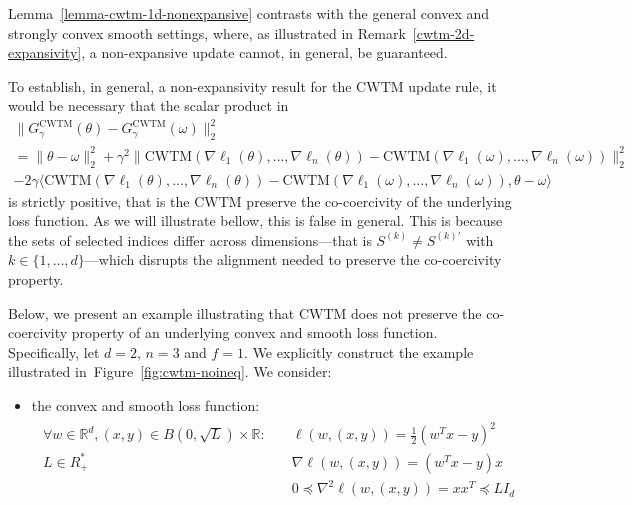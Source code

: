 \documentclass[twoside,11pt]{article}
\newcommand\mb{\mathbb}
\begin{document}
Lemma~\ref{lemma-cwtm-1d-nonexpansive} contrasts with the general convex and strongly convex smooth settings, where, as illustrated in Remark~\ref{cwtm-2d-expansivity}, a non-expansive update cannot, in general, be guaranteed. 
\begin{remark}\label{cwtm-2d-expansivity}
    To establish, in general, a non-expansivity result for the $\mathrm{CWTM}$ update rule, it would be necessary that the scalar product in
    \begin{multline*}
        \| G^{\mathrm{CWTM}}_{\gamma}(\theta) - G^{\mathrm{CWTM}}_{\gamma}(\omega) \|_2^2  \\
        = \| \theta - \omega \|_2^2 
        + \gamma^2 \| \mathrm{CWTM}(\nabla \ell_1 (\theta), \ldots, \nabla \ell_n (\theta)) - \mathrm{CWTM}(\nabla \ell_1 (\omega), \ldots, \nabla \ell_n (\omega)) \|_2^2 \\
        - 2 \gamma \langle \mathrm{CWTM}(\nabla \ell_1 (\theta), \ldots, \nabla \ell_n (\theta)) - \mathrm{CWTM}(\nabla \ell_1 (\omega), \ldots, \nabla \ell_n (\omega)) , \theta - \omega \rangle
    \end{multline*}
    is strictly positive, that is the $\mathrm{CWTM}$ preserve the co-coercivity of the underlying loss function. 
    As we will illustrate bellow, this is false in general. 
    This is because the sets of selected indices differ across dimensions---that is $S^{(k)} \neq S^{(k)\prime}$ with $k \in \{1, \ldots, d\}$---which disrupts the alignment needed to preserve the co-coercivity property.

    Below, we present an example illustrating that $\mathrm{CWTM}$ does not preserve the co-coercivity property of an underlying convex and smooth loss function.
    Specifically, let $d=2$, $n=3$ and $f=1$. We explicitly construct the example illustrated in~Figure~\ref{fig:cwtm-noineq}. We consider: 
    \begin{itemize}
        \item the convex and smooth loss function:
            \begin{align*}
            \begin{split}
                \forall w \in \mb{R}^d, (x,y) \in B(0, \sqrt{L}) \times \mb{R}: \quad
                & \ell(w, (x, y)) = \frac{1}{2} {(w^T x - y)}^2 \\
                L \in R_+^* \quad \quad \quad \quad \quad \quad \quad 
                & \nabla \ell(w, (x, y)) = (w^T x - y) x\\
                & 0 \preceq  \nabla^2 \ell(w, (x, y)) = xx^T \preceq L I_d
            \end{split}
            \end{align*}
        

\end{itemize}
\end{remark}
\end{document}
